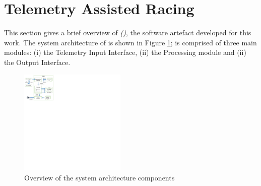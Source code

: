 \documentclass{sig-alternate}
\begin{document}
{\section{Telemetry Assisted Racing}
\label{sec:DesignImplementation}

This section gives a brief overview of \emph{\methodnamefull (\methodname)}, the software artefact developed for this work. The system architecture of \methodname is shown in Figure \ref{fig:SystemArch}; \methodname is comprised of three main modules: (i) the Telemetry Input Interface, (ii) the Processing module and (ii) the Output Interface. 

	

%


\begin{figure}[!htb]
	\centering
	\includegraphics[width=0.45\textwidth]{diagrams/SystemArch}
	\caption{Overview of the system architecture components}
	\label{fig:SystemArch}
\end{figure}

}
\end{document}
